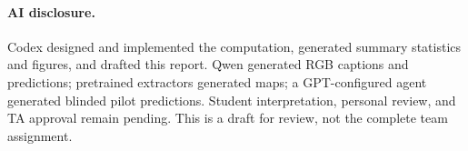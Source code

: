 \documentclass[10pt]{article}
\begin{document}
\paragraph{AI disclosure.} Codex designed and implemented the computation, generated summary statistics and figures, and drafted this report. Qwen generated RGB captions and predictions; pretrained extractors generated maps; a GPT-configured agent generated blinded pilot predictions. Student interpretation, personal review, and TA approval remain pending. This is a draft for review, not the complete team assignment.
\end{document}
